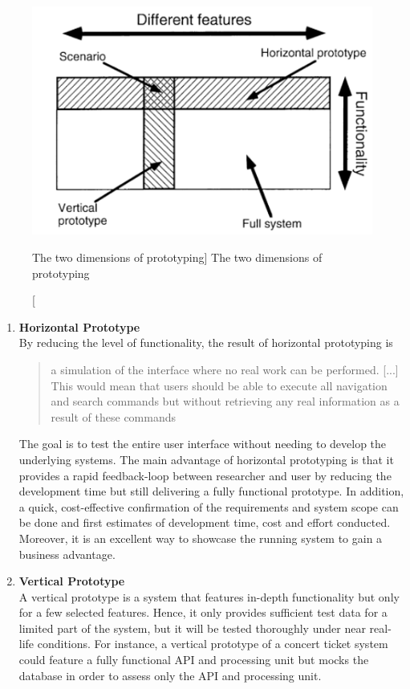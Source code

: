     \begin{figure}[ht]
        \includegraphics[width=0.7\linewidth]{images/methodology/nielsenProto.PNG}\centering
        \caption
        [The two dimensions of prototyping]
        {The two dimensions of prototyping \cite{Nielsen1993UsabilityEngineering}}
    \end{figure}
    
    \begin{enumerate}
        \item \textbf{Horizontal Prototype}\\
            By reducing the level of functionality, the result of horizontal prototyping is \blockquote{a simulation of the interface where no real work can be performed. [...] This would mean that users should be able to execute all navigation and search commands but without retrieving any real information as a result of these commands}.\autocite{Nielsen1993UsabilityEngineering} The goal is to test the entire user interface without needing to develop the underlying systems. The main advantage of horizontal prototyping is that it provides a rapid feedback-loop between researcher and user by reducing the development time but still delivering a fully functional prototype. In addition, a quick, cost-effective confirmation of the requirements and system scope can be done and first estimates of development time, cost and effort conducted. Moreover, it is an excellent way to showcase the running system to gain a business advantage.\autocite{Nielsen1993UsabilityEngineering}
        \item \textbf{Vertical Prototype}\\
            A vertical prototype is a system that features in-depth functionality but only for a few selected features. Hence, it only provides sufficient test data for a limited part of the system, but it will be tested thoroughly under near real-life conditions. For instance, a vertical prototype of a concert ticket system could feature a fully functional API and processing unit but mocks the database in order to assess only the API and processing unit. 
    \end{enumerate}
    
